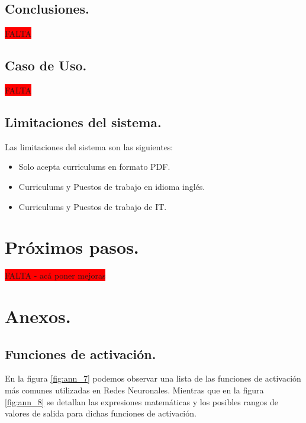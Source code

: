 \documentclass[12pt,a4paper]{article}
\begin{document}
\begin{sloppypar}
\cleardoublepage

\subsection{Conclusiones.}
\colorbox{red}{FALTA}

\cleardoublepage

\subsection{Caso de Uso.}
\colorbox{red}{FALTA}

\cleardoublepage

\subsection{Limitaciones del sistema.}

Las limitaciones del sistema son las siguientes:
\begin{itemize}
\item Solo acepta curriculums en formato PDF.
\item Curriculums y Puestos de trabajo en idioma inglés. 
\item Curriculums y Puestos de trabajo de IT. 
\end{itemize}

\cleardoublepage

\section{Próximos pasos.}  
\colorbox{red}{FALTA - acá poner mejoras}

\cleardoublepage

\section{Anexos.}

\subsection{Funciones de activación.}\label{anexo_func_activ}

En la figura \ref{fig:ann_7} podemos observar una lista de las funciones de activación más comunes utilizadas en Redes Neuronales. Mientras que en la figura \ref{fig:ann_8} se detallan las expresiones matemáticas y los posibles rangos de valores de salida para dichas funciones de activación. 


\end{sloppypar}
\end{document}
